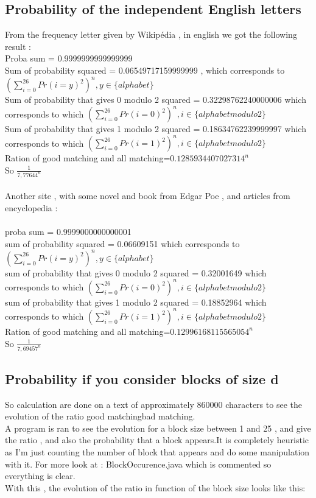 \documentclass{article}
\begin{document}
\subsection{Probability of the independent English letters}
From the frequency letter given by Wikip\'edia , in english we got the following result :\\
Proba sum = 0.9999999999999999\\
Sum of probability squared = 0.06549717159999999 , which corresponds to $(\sum_{i=0}^{26}{Pr(i=y)^2})^n, y \in \{alphabet\} $\\
Sum of probability that gives 0 modulo 2 squared  = 0.32298762240000006 which corresponds to which $(\sum_{i=0}^{26}{Pr(i=0)^2})^n, i \in \{alphabet modulo 2\} $\\
Sum of probability that gives 1 modulo 2 squared = 0.18634762239999997 which corresponds to which $(\sum_{i=0}^{26}{Pr(i=1)^2})^n, i \in \{alphabet modulo 2\} $\\
Ration of good matching and all matching=$0.1285934407027314^n$\\
So $\frac{1}{7,77644^n}$
\\
\\
Another site , with some novel and book from Edgar Poe , and articles from encyclopedia :\\
\\
proba sum = 0.9999000000000001\\
sum of probability squared = 0.06609151 which corresponds to $(\sum_{i=0}^{26}{Pr(i=y)^2})^n, y \in \{alphabet\} $\\
sum of probability that gives 0 modulo 2 squared = 0.32001649 which corresponds to which $(\sum_{i=0}^{26}{Pr(i=0)^2})^n, i \in \{alphabet modulo 2\} $\\
sum of probability that gives 1 modulo 2 squared = 0.18852964 which corresponds to which $(\sum_{i=0}^{26}{Pr(i=1)^2})^n, i \in \{alphabet modulo 2\} $\\
Ration of good matching and all matching=$0.12996168115565054^n$\\
So $\frac{1}{7,69457^n}$

\subsection{Probability if you consider blocks of size d}
So calculation are done on a text of approximately $860000$ characters to see the evolution of the ratio good matching\/bad matching.\\
A program is ran to see the evolution for a block size between 1 and 25 , and give the ratio , and also the probability that a block appears.It is completely heuristic as I'm just counting the number of block that appears and do some manipulation with it. For more look at : BlockOccurence.java which is commented so everything is clear.\\
With this , the evolution of the ratio in function of the block size looks like this:\\
\end{document}
